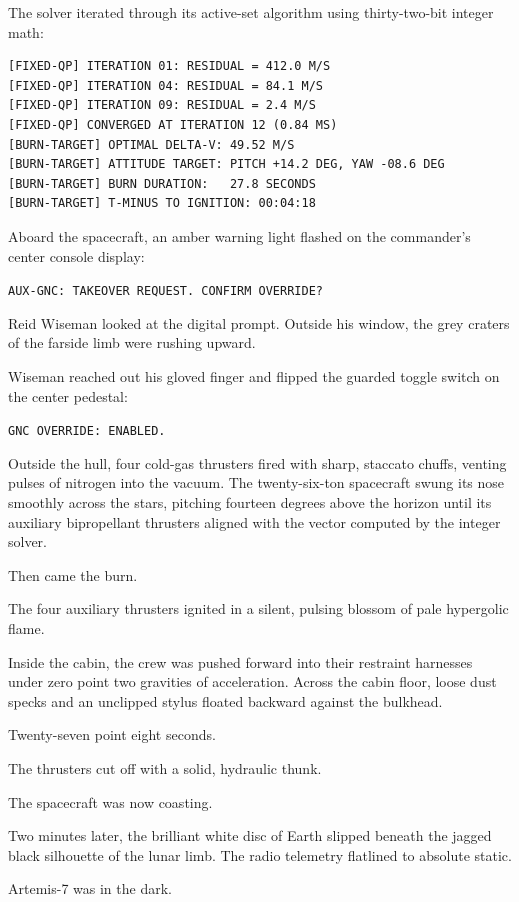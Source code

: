 \documentclass[12pt,twoside,openright]{book}
\begin{document}
The solver iterated through its active-set algorithm using
thirty-two-bit integer math:

\begin{lstlisting}
[FIXED-QP] ITERATION 01: RESIDUAL = 412.0 M/S
[FIXED-QP] ITERATION 04: RESIDUAL = 84.1 M/S
[FIXED-QP] ITERATION 09: RESIDUAL = 2.4 M/S
[FIXED-QP] CONVERGED AT ITERATION 12 (0.84 MS)
[BURN-TARGET] OPTIMAL DELTA-V: 49.52 M/S
[BURN-TARGET] ATTITUDE TARGET: PITCH +14.2 DEG, YAW -08.6 DEG
[BURN-TARGET] BURN DURATION:   27.8 SECONDS
[BURN-TARGET] T-MINUS TO IGNITION: 00:04:18
\end{lstlisting}

Aboard the spacecraft, an amber warning light flashed on the commander's
center console display:

\passthrough{\lstinline!AUX-GNC: TAKEOVER REQUEST. CONFIRM OVERRIDE?!}

Reid Wiseman looked at the digital prompt. Outside his window, the grey
craters of the farside limb were rushing upward.

Wiseman reached out his gloved finger and flipped the guarded toggle
switch on the center pedestal:

\passthrough{\lstinline!GNC OVERRIDE: ENABLED.!}

Outside the hull, four cold-gas thrusters fired with sharp, staccato
chuffs, venting pulses of nitrogen into the vacuum. The twenty-six-ton
spacecraft swung its nose smoothly across the stars, pitching fourteen
degrees above the horizon until its auxiliary bipropellant thrusters
aligned with the vector computed by the integer solver.

Then came the burn.

The four auxiliary thrusters ignited in a silent, pulsing blossom of
pale hypergolic flame.

Inside the cabin, the crew was pushed forward into their restraint
harnesses under zero point two gravities of acceleration. Across the
cabin floor, loose dust specks and an unclipped stylus floated backward
against the bulkhead.

Twenty-seven point eight seconds.

The thrusters cut off with a solid, hydraulic thunk.

The spacecraft was now coasting.

Two minutes later, the brilliant white disc of Earth slipped beneath the
jagged black silhouette of the lunar limb. The radio telemetry flatlined
to absolute static.

Artemis-7 was in the dark.
\end{document}
